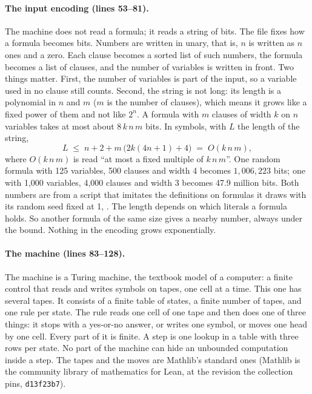 \paragraph{The input encoding (lines 53--81).}
The machine does not read a formula; it reads a string of bits. The
file fixes how a formula becomes bits. Numbers are written in unary,
that is, $n$ is written as $n$ ones and a zero. Each clause becomes a
sorted list of such numbers, the formula becomes a list of clauses, and
the number of variables is written in front. Two things matter. First,
the number of variables is part of the input, so a variable used in no
clause still counts. Second, the string is not long: its length is a polynomial in $n$ and $m$ ($m$ is the number of clauses), which means it grows like a fixed power of them and not like $2^n$. A formula with $m$ clauses of width $k$ on $n$ variables takes at most about $8\,k\,n\,m$ bits. In symbols, with $L$ the length of the string,
\[
  L \;\le\; n + 2 + m\,\bigl(2k(4n+1) + 4\bigr) \;=\; O(k\,n\,m),
\]
where $O(k\,n\,m)$ is read ``at most a fixed multiple of $k\,n\,m$''.
One random formula with 125 variables, 500 clauses and width 4 becomes
$1{,}006{,}223$ bits; one with 1,000 variables, 4,000 clauses and width
3 becomes 47.9 million bits. Both numbers are from a script that
imitates the definitions on formulas it draws with its random seed fixed
at 1, . The length
depends on which literals a formula holds. So another formula of the same
size gives a nearby number, always under the bound. Nothing in the
encoding grows exponentially.

\paragraph{The machine (lines 83--128).}
The machine is a Turing machine, the textbook model of a computer: a finite control that reads and writes symbols on tapes, one cell at a time. This one has several tapes. It consists of a finite table of states, a finite number of tapes, and one rule per state. The rule reads
one cell of one tape and then does one of three things: it stops with a yes-or-no answer, or
writes one symbol, or moves one head by one cell. Every part of it is
finite. A step is one lookup in a table with three rows per state. No
part of the machine can hide an unbounded computation inside a step.
The tapes and the moves are Mathlib's standard ones (Mathlib is the
community library of mathematics for Lean, at the revision the
collection pins, \texttt{d13f23b7}).

